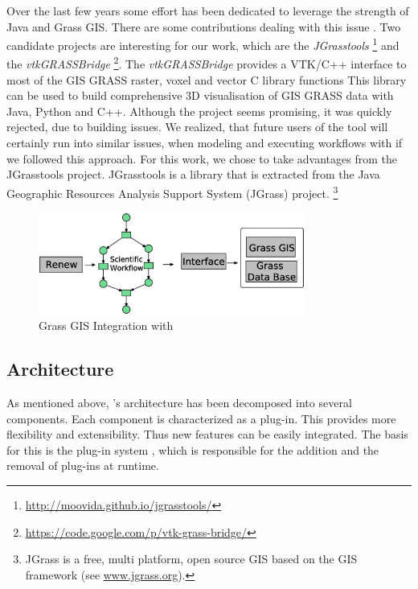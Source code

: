 Over the last few years some effort has been dedicated to leverage the strength of Java and Grass GIS. 
%
There are some contributions dealing with this issue \cite{moldt18}. 
%
Two candidate projects are interesting for our work, which are the \textit{JGrasstools}%
\footnote{\url{http://moovida.github.io/jgrasstools/}} 
and the \textit{vtkGRASSBridge}%
\footnote{\url{https://code.google.com/p/vtk-grass-bridge/}}.
%
The \textit{vtkGRASSBridge} provides a VTK/C++ interface to most of the GIS GRASS raster, voxel and vector C library functions
%
This library can be used to build comprehensive 3D visualisation of GIS GRASS data with Java, Python and C++.
%
Although the project seems promising, it was quickly rejected, due to building issues. 
%
We realized, that future users of the tool will certainly run into similar issues, when modeling and executing workflows with \RenewGrass{} if we followed this approach.
%
For this work, we chose to take advantages from the JGrasstools project.
%
JGrasstools is a library that is extracted from the Java Geographic Resources Analysis Support System (JGrass) project.%
\footnote{JGrass is a free, multi platform, open source GIS based on the GIS framework (see \url{www.jgrass.org}).}
%

\begin{figure}[!t]
\centering
\includegraphics[width=0.78\textwidth,height=0.24\textheight]{overview}
\caption{Grass GIS Integration with \Renew{}}
\label{fig:overview}
\end{figure}


\subsection{Architecture}
\label{sec:arch}
%
As mentioned above, \Renew{}'s architecture has been decomposed into several components.
%
Each component is characterized as a plug-in.
%
This provides more flexibility and extensibility.
%
Thus new features can be easily integrated.
%
The basis for this is the \Renew{} plug-in system \cite{Duvigneau10}, which is responsible for the addition and the removal of plug-ins at runtime.


